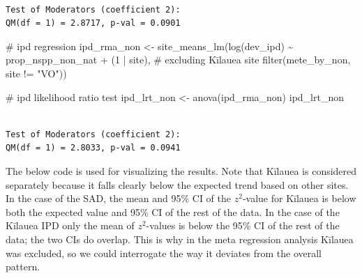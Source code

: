 \documentclass[
  letterpaper,
  DIV=11,
  numbers=noendperiod]{scrartcl}
\newenvironment{Shaded}{\begin{snugshade}}{\end{snugshade}}
\newcommand{\CommentTok}[1]{\textcolor[rgb]{0.37,0.37,0.37}{#1}}
\newcommand{\DecValTok}[1]{\textcolor[rgb]{0.68,0.00,0.00}{#1}}
\newcommand{\FunctionTok}[1]{\textcolor[rgb]{0.28,0.35,0.67}{#1}}
\newcommand{\NormalTok}[1]{\textcolor[rgb]{0.00,0.23,0.31}{#1}}
\newcommand{\OtherTok}[1]{\textcolor[rgb]{0.00,0.23,0.31}{#1}}
\newcommand{\SpecialCharTok}[1]{\textcolor[rgb]{0.37,0.37,0.37}{#1}}
\newcommand{\StringTok}[1]{\textcolor[rgb]{0.13,0.47,0.30}{#1}}
\begin{document}
\begin{verbatim}

Test of Moderators (coefficient 2):
QM(df = 1) = 2.8717, p-val = 0.0901
\end{verbatim}

\begin{Shaded}
\begin{Highlighting}[]
\CommentTok{\# ipd regression }
\NormalTok{ipd\_rma\_non }\OtherTok{\textless{}{-}} \FunctionTok{site\_means\_lm}\NormalTok{(}\FunctionTok{log}\NormalTok{(dev\_ipd) }\SpecialCharTok{\textasciitilde{}}\NormalTok{ prop\_nspp\_non\_nat }\SpecialCharTok{+}\NormalTok{ (}\DecValTok{1} \SpecialCharTok{|}\NormalTok{ site), }
                             \CommentTok{\# excluding Kīlauea site}
                             \FunctionTok{filter}\NormalTok{(mete\_by\_non, site }\SpecialCharTok{!=} \StringTok{"VO"}\NormalTok{))}

\CommentTok{\# ipd likelihood ratio test}
\NormalTok{ipd\_lrt\_non }\OtherTok{\textless{}{-}} \FunctionTok{anova}\NormalTok{(ipd\_rma\_non)}
\NormalTok{ipd\_lrt\_non}
\end{Highlighting}
\end{Shaded}

\begin{verbatim}

Test of Moderators (coefficient 2):
QM(df = 1) = 2.8033, p-val = 0.0941
\end{verbatim}

The below code is used for visualizing the results. Note that Kīlauea is
considered separately because it falls clearly below the expected trend
based on other sites. In the case of the SAD, the mean and 95\% CI of
the \(z^2\)-value for Kīlauea is below both the expected value and 95\%
CI of the rest of the data. In the case of the Kīlauea IPD only the mean
of \(z^2\)-values is below the 95\% CI of the rest of the data; the two
CIs do overlap. This is why in the meta regression analysis Kīlauea was
excluded, so we could interrogate the way it deviates from the overall
pattern.
\end{document}
